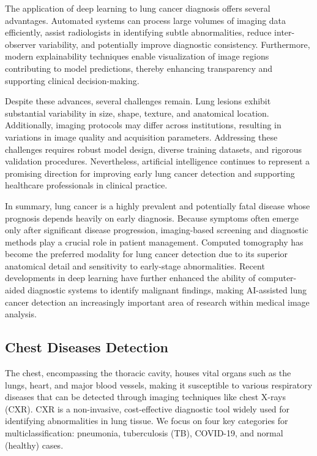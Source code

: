 The application of deep learning to lung cancer diagnosis offers several advantages. Automated systems can process large volumes of imaging data efficiently, assist radiologists in identifying subtle abnormalities, reduce inter-observer variability, and potentially improve diagnostic consistency. Furthermore, modern explainability techniques enable visualization of image regions contributing to model predictions, thereby enhancing transparency and supporting clinical decision-making.

Despite these advances, several challenges remain. Lung lesions exhibit substantial variability in size, shape, texture, and anatomical location. Additionally, imaging protocols may differ across institutions, resulting in variations in image quality and acquisition parameters. Addressing these challenges requires robust model design, diverse training datasets, and rigorous validation procedures. Nevertheless, artificial intelligence continues to represent a promising direction for improving early lung cancer detection and supporting healthcare professionals in clinical practice.

In summary, lung cancer is a highly prevalent and potentially fatal disease whose prognosis depends heavily on early diagnosis. Because symptoms often emerge only after significant disease progression, imaging-based screening and diagnostic methods play a crucial role in patient management. Computed tomography has become the preferred modality for lung cancer detection due to its superior anatomical detail and sensitivity to early-stage abnormalities. Recent developments in deep learning have further enhanced the ability of computer-aided diagnostic systems to identify malignant findings, making AI-assisted lung cancer detection an increasingly important area of research within medical image analysis.

\subsection{Chest Diseases Detection}

The chest, encompassing the thoracic cavity, houses vital organs such as the lungs, heart, and major blood vessels, making it susceptible to various respiratory diseases that can be detected through imaging techniques like chest X-rays (CXR). CXR is a non-invasive, cost-effective diagnostic tool widely used for identifying abnormalities in lung tissue. We focus on four key categories for multiclassification: pneumonia, tuberculosis (TB), COVID-19, and normal (healthy) cases.

